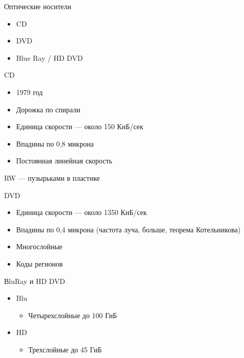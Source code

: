 \documentclass[xetex,aspectratio=43]{beamer}
\begin{document}
\begin{frame}{Оптические носители}
\begin{itemize}
\tightlist
\item
  CD
\item
  DVD
\item
  Blue Ray / HD DVD
\end{itemize}
\end{frame}

\begin{frame}{CD}
        \begin{itemize}
            \tightlist
            \item
            1979 год
            \item
            Дорожка по спирали
            \item
            Единица скорости --- около 150 КиБ/сек
            \item
            Впадины по 0,8 микрона
            \item
            Постоянная линейная скорость
        \end{itemize}

        RW --- пузырьками в пластике
\end{frame}

\begin{frame}{DVD}
        \begin{itemize}
            \tightlist
            \item
            Единица скорости --- около 1350 КиБ/сек
            \item
            Впадины по 0,4 микрона (частота луча, больше, теорема Котельникова)
            \item
            Многослойные
            \item
            Коды регионов
        \end{itemize}
\end{frame}

\begin{frame}{ВluRay и HD DVD}
        \begin{itemize}
            \tightlist
            \item
            Blu

            \begin{itemize}
                \tightlist
                \item
                Четырехслойные до 100 ГиБ
            \end{itemize}
            \item
            HD

            \begin{itemize}
                \tightlist
                \item
                Трехслойные до 45 ГиБ
            \end{itemize}
        \end{itemize}

\end{frame}
\end{document}
